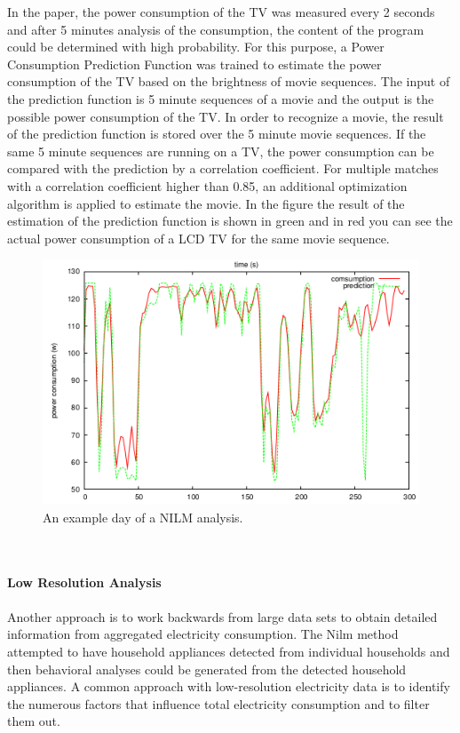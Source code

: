 In the paper, the power consumption of the TV was measured every 2 seconds and after 5 minutes analysis of the consumption, the content of the program could be determined with high probability. For this purpose, a Power Consumption Prediction Function was trained to estimate the power consumption of the TV based on the brightness of movie sequences. The input of the prediction function is 5 minute sequences of a movie and the output is the possible power consumption of the TV. 
In order to recognize a movie, the result of the prediction function is stored over the 5 minute movie sequences. If the same 5 minute sequences are running on a TV, the power consumption can be compared with the prediction by a correlation coefficient. For multiple matches with a correlation coefficient higher than 0.85, an additional optimization algorithm is applied to estimate the movie. In the figure the result of the estimation of the prediction function is shown in green and in red you can see the actual power consumption of a LCD TV for the same movie sequence. 
\begin{figure}[tbp]
  \centering
  \includegraphics[width=1\textwidth]{images/Fernseher.png}
  \caption[Short description]{An example day of a NILM analysis.}
  \label{fig:Nilm}
\end{figure}
\\
\\
\textbf{Low Resolution Analysis}
\\
\\
Another approach is to work backwards from large data sets to obtain detailed information from aggregated electricity consumption. The Nilm method attempted to have household appliances detected from individual households and then behavioral analyses could be generated from the detected household appliances. A common approach with low-resolution electricity data is to identify the numerous factors that influence total electricity consumption and to filter them out. 

